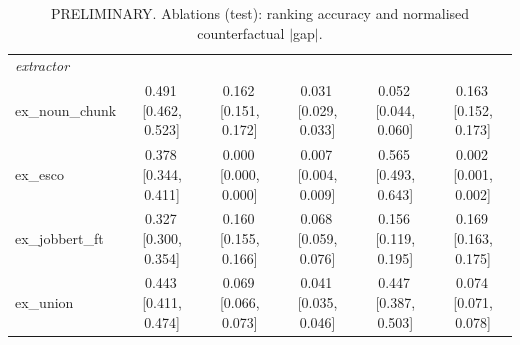 \begin{table}[t]
{\begin{tabular}{lccccc}
\midrule
\multicolumn{6}{l}{\textit{extractor}} \\
\quad ex\_noun\_chunk & 0.491\,{\scriptsize[0.462, 0.523]} & 0.162\,{\scriptsize[0.151, 0.172]} & 0.031\,{\scriptsize[0.029, 0.033]} & 0.052\,{\scriptsize[0.044, 0.060]} & 0.163\,{\scriptsize[0.152, 0.173]} \\
\quad ex\_esco & 0.378\,{\scriptsize[0.344, 0.411]} & 0.000\,{\scriptsize[0.000, 0.000]} & 0.007\,{\scriptsize[0.004, 0.009]} & 0.565\,{\scriptsize[0.493, 0.643]} & 0.002\,{\scriptsize[0.001, 0.002]} \\
\quad ex\_jobbert\_ft & 0.327\,{\scriptsize[0.300, 0.354]} & 0.160\,{\scriptsize[0.155, 0.166]} & 0.068\,{\scriptsize[0.059, 0.076]} & 0.156\,{\scriptsize[0.119, 0.195]} & 0.169\,{\scriptsize[0.163, 0.175]} \\
\quad ex\_union & 0.443\,{\scriptsize[0.411, 0.474]} & 0.069\,{\scriptsize[0.066, 0.073]} & 0.041\,{\scriptsize[0.035, 0.046]} & 0.447\,{\scriptsize[0.387, 0.503]} & 0.074\,{\scriptsize[0.071, 0.078]} \\
\bottomrule
\end{tabular}
}
\caption{PRELIMINARY. Ablations (test): ranking accuracy and normalised counterfactual $|$gap$|$.}
\label{tab:ablations}
\end{table}
